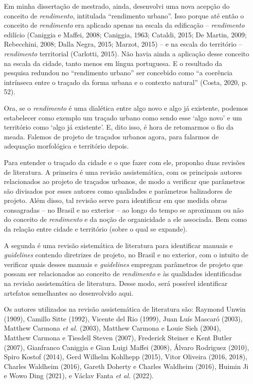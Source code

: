 \documentclass[12pt, a4paper]{book} %
\begin{document}
        Em minha dissertação de mestrado, ainda, desenvolvi uma nova acepção do conceito de \textit{rendimento}, intitulada ``rendimento urbano''. Isso porque até então o conceito de \textit{rendimento} era aplicado apenas na escala da edificação – \textit{rendimento} edilício (Caniggia e Maffei, 2008; Caniggia, 1963; Cataldi, 2015; De Martin, 2009; Rebecchini, 2008; Dalla Negra, 2015; Marzot, 2015) – e na escala do território – \textit{rendimento} territorial (Carlotti, 2015). Não havia ainda a aplicação desse conceito na escala da cidade, tanto menos em língua portuguesa. E o resultado da pesquisa redundou no ``rendimento urbano'' ser concebido como ``a coerência intrínseca entre o traçado da forma urbana e o contexto natural'' (Costa, 2020, p. 52).

        Ora, se o \textit{rendimento} é uma dialética entre algo novo e algo já existente, podemos estabelecer como exemplo um traçado urbano como sendo esse `algo novo' e um território como `algo já existente'. E, dito isso, é hora de retomarmos o fio da meada. Falemos de projeto de traçados urbanos agora, para falarmos de adequação morfológica e território depois.

        Para entender o traçado da cidade e o que fazer com ele, proponho duas revisões de literatura. A primeira é uma revisão assistemática, com os principais autores relacionados ao projeto de traçados urbanos, de modo a verificar que parâmetros são divisados por esses autores como qualidades e parâmetros balizadores de projeto. Além disso, tal revisão serve para identificar em que medida obras consagradas – no Brasil e no exterior – ao longo do tempo se aproximam ou não do conceito de \textit{rendimento} e da noção de organicidade a ele associada. Bem como da relação entre cidade e território (sobre o qual se expande).

        A segunda é uma revisão sistemática de literatura para identificar manuais e \textit{guidelines} contendo diretrizes de projeto, no Brasil e no exterior, com o intuito de verificar quais desses manuais e \textit{guidelines} empregam parâmetros de projeto que possam ser relacionados ao conceito de \textit{rendimento} e às qualidades identificadas na revisão assistemática de literatura. Desse modo, será possível identificar artefatos semelhantes ao desenvolvido aqui.

        Os autores utilizados na revisão assistemática de literatura são: Raymond Unwin (1909), Camillo Sitte (1992), Vicente del Rio (1999), Juan Luís Mascaró (2003), Matthew Carmona \textit{et al.} (2003), Matthew Carmona e Louie Sieh (2004), Matthew Carmona e Tiesdell Steven (2007), Frederick Steiner e Kent Butler (2007), Gianfranco Caniggia e Gian Luigi Maffei (2008), Álvaro Rodriguez (2010), Spiro Kostof (2014), Gerd Wilhelm Kohlhepp (2015), Vitor Oliveira (2016, 2018), Charles Waldheim (2016), Gareth Doherty e Charles Waldheim (2016), Huimin Ji e Wowo Ding (2021), e Václav Fanta \textit{et al.} (2022).
\end{document}
